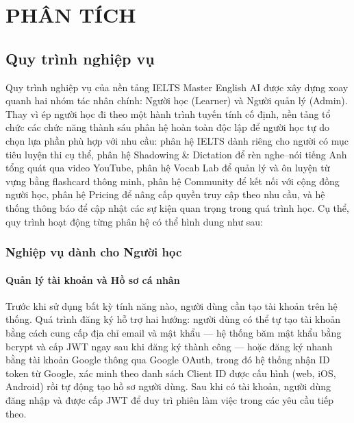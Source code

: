 \chapter{PHÂN TÍCH}

\section{Quy trình nghiệp vụ}

Quy trình nghiệp vụ của nền tảng IELTS Master English AI được xây dựng xoay quanh hai nhóm tác nhân chính: Người học (Learner) và Người quản lý (Admin). Thay vì ép người học đi theo một hành trình tuyến tính cố định, nền tảng tổ chức các chức năng thành sáu phân hệ hoàn toàn độc lập để người học tự do chọn lựa phần phù hợp với nhu cầu: phân hệ IELTS dành riêng cho người có mục tiêu luyện thi cụ thể, phân hệ Shadowing \& Dictation để rèn nghe--nói tiếng Anh tổng quát qua video YouTube, phân hệ Vocab Lab để quản lý và ôn luyện từ vựng bằng flashcard thông minh, phân hệ Community để kết nối với cộng đồng người học, phân hệ Pricing để nâng cấp quyền truy cập theo nhu cầu, và hệ thống thông báo để cập nhật các sự kiện quan trọng trong quá trình học. Cụ thể, quy trình hoạt động từng phân hệ có thể hình dung như sau:

\subsection{Nghiệp vụ dành cho Người học}

\subsubsection{Quản lý tài khoản và Hồ sơ cá nhân}
Trước khi sử dụng bất kỳ tính năng nào, người dùng cần tạo tài khoản trên hệ thống. Quá trình đăng ký hỗ trợ hai hướng: người dùng có thể tự tạo tài khoản bằng cách cung cấp địa chỉ email và mật khẩu --- hệ thống băm mật khẩu bằng bcrypt và cấp JWT ngay sau khi đăng ký thành công --- hoặc đăng ký nhanh bằng tài khoản Google thông qua Google OAuth, trong đó hệ thống nhận ID token từ Google, xác minh theo danh sách Client ID được cấu hình (web, iOS, Android) rồi tự động tạo hồ sơ người dùng. Sau khi có tài khoản, người dùng đăng nhập và được cấp JWT để duy trì phiên làm việc trong các yêu cầu tiếp theo.

